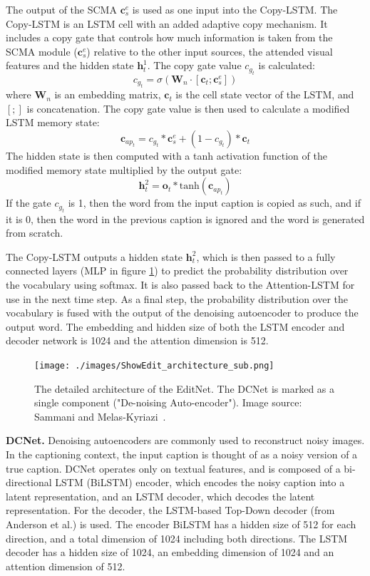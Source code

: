 \documentclass[english,twoside,openright]{HYgraduMLDS}
\newcommand{\matr}[1]{\bm{#1}}
\newcommand{\vect}[1]{\bm{#1}}
\begin{document}
The output of the SCMA $\vect{c}^e_s$ is used as one input into the Copy-LSTM. The Copy-LSTM is an LSTM cell with an added adaptive copy mechanism. It includes a copy gate that controls how much information is taken from the SCMA module ($\vect{c}^e_s$) relative to the other input sources, the attended visual features and the hidden state $\vect{h}^1_t$. The copy gate value $c_{g_t}$ is calculated:
\begin{equation}
c_{g_t} = \sigma(\matr{W}_n \cdot [\vect{c}_t; \vect{c}^e_s])
\end{equation}
%
where $\matr{W}_n$ is an embedding matrix, $\vect{c}_t$ is the cell state vector of the LSTM, and $[;]$ is concatenation. The copy gate value is then used to calculate a modified LSTM memory state:
\begin{equation}
\vect{c}_{ap_t} = c_{g_t} * \vect{c}^e_s + (1 - c_{g_t}) * \vect{c}_t
\end{equation}
%
The hidden state is then computed with a tanh activation function of the modified memory state multiplied by the output gate:
\begin{equation}
\vect{h}^2_t = \vect{o}_t * \text{tanh} (\vect{c}_{ap_t})
\end{equation}
%
If the gate $c_{g_t}$ is 1, then the word from the input caption is copied as such, and if it is 0, then the word in the previous caption is ignored and the word is generated from scratch.

The Copy-LSTM outputs a hidden state $\vect{h}^2_t$, which is then passed to a fully connected layers (MLP in figure \ref{fig:ShowEdit_architecture_sub}) to predict the probability distribution over the vocabulary using softmax. It is also passed back to the Attention-LSTM for use in the next time step. As a final step, the probability distribution over the vocabulary is fused with the output of the denoising autoencoder to produce the output word. The embedding and hidden size of both the LSTM encoder and decoder network is 1024 and the attention dimension is 512. 

\begin{figure}[H] 
\centering
\texttt{[image: ./images/ShowEdit\_architecture\_sub.png]}
\caption{The detailed architecture of the EditNet. The DCNet is marked as a single component ("De-noising Auto-encoder"). Image source: Sammani and Melas-Kyriazi~\cite{ShowEdit}.}
\label{fig:ShowEdit_architecture_sub} 
\end{figure}

\textbf{DCNet.}
Denoising autoencoders are commonly used to reconstruct noisy images. In the captioning context, the input caption is thought of as a noisy version of a true caption. DCNet\cite{ShowEdit} operates only on textual features, and is composed of a bi-directional LSTM (BiLSTM) encoder, which encodes the noisy caption into a latent representation, and an LSTM decoder, which decodes the latent representation. For the decoder, the LSTM-based Top-Down decoder (from Anderson et al.\cite{BottomUp}) is used. The encoder BiLSTM has a hidden size of 512 for each direction, and a total dimension of 1024 including both directions. The LSTM decoder has a hidden size of 1024, an embedding dimension of 1024 and an attention dimension of 512.
\end{document}

